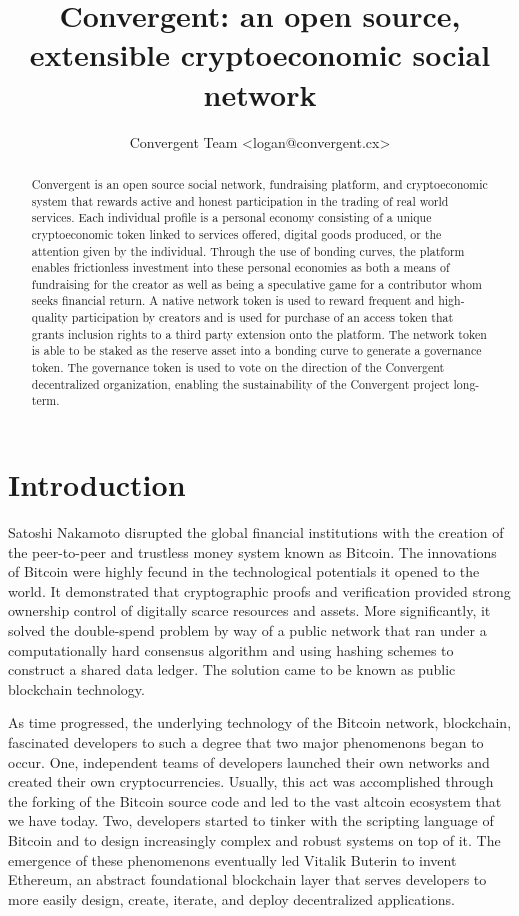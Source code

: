 \documentclass[a4paper, 10pt]{article}
\title{Convergent: an open source, extensible cryptoeconomic social network}
\author{Convergent Team <logan@convergent.cx>}
\begin{document}
\maketitle

\begin{abstract}
Convergent is an open source social network, fundraising platform, and cryptoeconomic system that rewards active and honest participation in the trading of real world services. Each individual profile is a personal economy consisting of a unique cryptoeconomic token linked to services offered, digital goods produced, or the attention given by the individual. Through the use of bonding curves, the platform enables frictionless investment into these personal economies as both a means of fundraising for the creator as well as being a speculative game for a contributor whom seeks financial return. A native network token is used to reward frequent and high-quality participation by creators and is used for purchase of an access token that grants inclusion rights to a third party extension onto the platform. The network token is able to be staked as the reserve asset into a bonding curve to generate a governance token. The governance token is used to vote on the direction of the Convergent decentralized organization, enabling the sustainability of the Convergent project long-term.
\end{abstract}

\section{Introduction}

Satoshi Nakamoto disrupted the global financial institutions with the creation of the peer-to-peer and trustless money system known as Bitcoin\cite{bitcoin}. The innovations of Bitcoin were highly fecund in the technological potentials it opened to the world. It demonstrated that cryptographic proofs and verification provided strong ownership control of digitally scarce resources and assets. More significantly, it solved the double-spend problem by way of a public network that ran under a computationally hard consensus algorithm and using hashing schemes to construct a shared data ledger. The solution came to be known as public blockchain technology.

As time progressed, the underlying technology of the Bitcoin network, blockchain, fascinated developers to such a degree that two major phenomenons began to occur. One, independent teams of developers launched their own networks and created their own cryptocurrencies. Usually, this act was accomplished through the forking of the Bitcoin source code and led to the vast altcoin ecosystem that we have today. Two, developers started to tinker with the scripting language of Bitcoin and to design increasingly complex and robust systems on top of it. The emergence of these phenomenons eventually led Vitalik Buterin to invent Ethereum, an abstract foundational blockchain layer that serves developers to more easily design, create, iterate, and deploy decentralized applications\cite{ethereum}.
\end{document}
